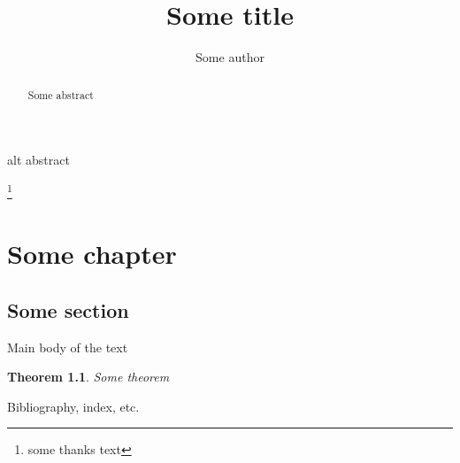 \documentclass{smfbook}
\title[short title]{Some title}
\author[short author]{Some author}
\newtheorem{thm}{Theorem}
\begin{document}
\frontmatter
\begin{abstract}
Some abstract
\end{abstract}
\begin{altabstract}
alt abstract
\end{altabstract}
\thanks{some thanks text}
\maketitle %
\tableofcontents %
\mainmatter
\chapter{Some chapter}
\section{Some section}
Main body of the text
\begin{thm}
Some theorem
\end{thm}
\backmatter
Bibliography, index, etc.
\end{document}
